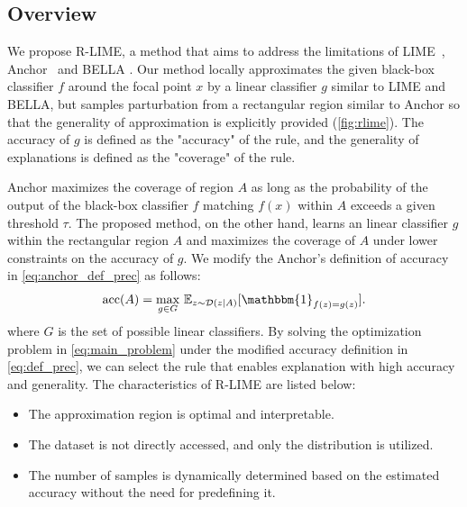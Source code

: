 \documentclass[runningheads]{llncs}
\begin{document}
\subsection{Overview}
We propose R-LIME,
a method that aims to address the limitations of LIME~\cite{ribeiro2016why},
Anchor~\cite{ribeiro2018anchors} and BELLA \cite{radulovic2023bella}.
Our method locally approximates the given black-box classifier $f$
around the focal point $x$ by a linear classifier $g$ similar to LIME and BELLA,
but samples parturbation from a rectangular region similar to Anchor
so that the generality of approximation is explicitly provided
(\cref{fig:rlime}).
The accuracy of $g$ is defined as the "accuracy" of the rule,
and the generality of explanations is defined as the "coverage" of the rule.

Anchor maximizes the coverage of region $A$
as long as the probability of the output of the black-box classifier $f$ matching $f(x)$
within $A$ exceeds a given threshold $\tau$.
The proposed method, on the other hand, learns an linear classifier $g$
within the rectangular region $A$ and maximizes the coverage of $A$
under lower constraints on the accuracy of $g$.
We modify the Anchor's definition of accuracy in \cref{eq:anchor_def_prec}
as follows:
\begin{equation}
	\Prec(A)=\underset{g\in G}{\max}\ \mathbb{E}_{z\sim\mathcal{D}(z|A)}
	[\mathbbm{1}_{f(z)=g(z)}]. \label{eq:def_prec}
\end{equation}
where $G$ is the set of possible linear classifiers.
By solving the optimization problem in \cref{eq:main_problem}
under the modified accuracy definition in \cref{eq:def_prec},
we can select the rule that enables explanation with high accuracy and generality.
The characteristics of R-LIME are listed below:
\begin{itemize}
	\item The approximation region is optimal and interpretable.
	\item The dataset is not directly accessed, and only the distribution is utilized.
	\item The number of samples is dynamically determined
	      based on the estimated accuracy without the need for predefining it.
\end{itemize}
\end{document}
